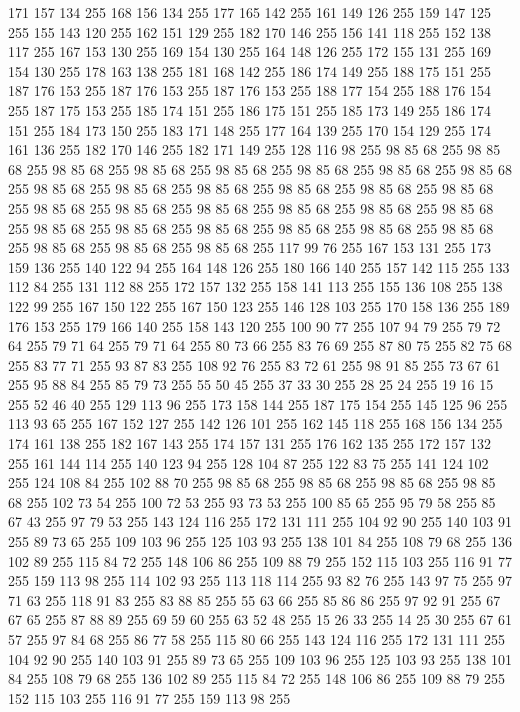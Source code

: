 171 157 134 255 168 156 134 255 177 165 142 255 161 149 126 255 159 147 125 255 155 143 120 255 162 151 129 255 182 170 146 255 156 141 118 255 152 138 117 255 167 153 130 255 169 154 130 255 164 148 126 255 172 155 131 255 169 154 130 255 178 163 138 255 181 168 142 255 186 174 149 255 188 175 151 255 187 176 153 255 187 176 153 255 187 176 153 255 188 177 154 255 188 176 154 255 187 175 153 255 185 174 151 255 186 175 151 255 185 173 149 255 186 174 151 255 184 173 150 255 183 171 148 255 177 164 139 255 170 154 129 255 174 161 136 255 182 170 146 255 182 171 149 255 128 116 98 255 98 85 68 255 98 85 68 255 98 85 68 255 98 85 68 255 98 85 68 255 98 85 68 255 98 85 68 255 98 85 68 255 98 85 68 255 98 85 68 255 98 85 68 255 98 85 68 255 98 85 68 255 98 85 68 255 98 85 68 255 98 85 68 255 98 85 68 255 98 85 68 255 98 85 68 255 98 85 68 255 98 85 68 255 98 85 68 255 98 85 68 255 98 85 68 255 98 85 68 255 98 85 68 255 98 85 68 255
98 85 68 255 98 85 68 255 117 99 76 255 167 153 131 255 173 159 136 255 140 122 94 255 164 148 126 255 180 166 140 255 157 142 115 255 133 112 84 255 131 112 88 255 172 157 132 255 158 141 113 255 155 136 108 255 138 122 99 255 167 150 122 255 167 150 123 255 146 128 103 255 170 158 136 255 189 176 153 255 179 166 140 255 158 143 120 255 100 90 77 255 107 94 79 255 79 72 64 255 79 71 64 255 79 71 64 255 80 73 66 255 83 76 69 255 87 80 75 255 82 75 68 255 83 77 71 255 93 87 83 255 108 92 76 255 83 72 61 255 98 91 85 255 73 67 61 255 95 88 84 255 85 79 73 255 55 50 45 255 37 33 30 255 28 25 24 255 19 16 15 255 52 46 40 255 129 113 96 255 173 158 144 255 187 175 154 255 145 125 96 255 113 93 65 255 167 152 127 255 142 126 101 255 162 145 118 255 168 156 134 255 174 161 138 255 182 167 143 255 174 157 131 255 176 162 135 255 172 157 132 255 161 144 114 255 140 123 94 255 128 104 87 255 122 83 75 255 141 124 102 255 124 108 84 255
102 88 70 255 98 85 68 255 98 85 68 255 98 85 68 255 98 85 68 255 102 73 54 255 100 72 53 255 93 73 53 255 100 85 65 255 95 79 58 255 85 67 43 255 97 79 53 255 143 124 116 255 172 131 111 255 104 92 90 255 140 103 91 255 89 73 65 255 109 103 96 255 125 103 93 255 138 101 84 255 108 79 68 255 136 102 89 255 115 84 72 255 148 106 86 255 109 88 79 255 152 115 103 255 116 91 77 255 159 113 98 255 114 102 93 255 113 118 114 255 93 82 76 255 143 97 75 255 97 71 63 255 118 91 83 255 83 88 85 255 55 63 66 255 85 86 86 255 97 92 91 255 67 67 65 255 87 88 89 255 69 59 60 255 63 52 48 255 15 26 33 255 14 25 30 255 67 61 57 255 97 84 68 255 86 77 58 255 115 80 66 255 143 124 116 255 172 131 111 255 104 92 90 255 140 103 91 255 89 73 65 255 109 103 96 255 125 103 93 255 138 101 84 255 108 79 68 255 136 102 89 255 115 84 72 255 148 106 86 255 109 88 79 255 152 115 103 255 116 91 77 255 159 113 98 255
